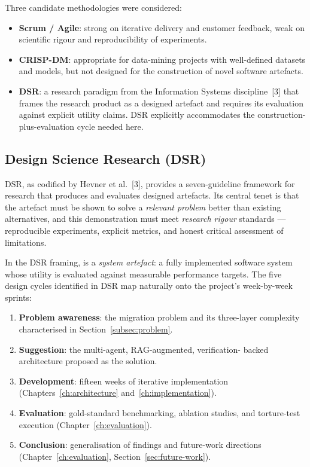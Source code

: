 Three candidate methodologies were considered:

\begin{itemize}
  \item \textbf{Scrum / Agile}: strong on iterative delivery and customer
    feedback, weak on scientific rigour and reproducibility of experiments.
  \item \textbf{\ac{CRISP-DM}}: appropriate for data-mining projects with
    well-defined datasets and models, but not designed for the construction
    of novel software artefacts.
  \item \textbf{\ac{DSR}}: a research paradigm from the Information Systems
    discipline~[3] that frames the research product as a designed artefact and
    requires its evaluation against explicit utility claims. \ac{DSR} explicitly
    accommodates the construction-plus-evaluation cycle needed here.
\end{itemize}

\subsection{Design Science Research (DSR)}
\label{subsec:dsr}

\ac{DSR}, as codified by Hevner et al.~[3], provides a seven-guideline
framework for research that produces and evaluates designed artefacts. Its
central tenet is that the artefact must be shown to solve a \emph{relevant
problem} better than existing alternatives, and this demonstration must meet
\emph{research rigour} standards --- reproducible experiments, explicit metrics,
and honest critical assessment of limitations.

In the \ac{DSR} framing, \codara{} is a \emph{system artefact}: a fully
implemented software system whose utility is evaluated against measurable
performance targets. The five design cycles identified in \ac{DSR} map
naturally onto the project's week-by-week sprints:

\begin{enumerate}
  \item \textbf{Problem awareness}: the migration problem and its three-layer
    complexity characterised in Section~\ref{subsec:problem}.
  \item \textbf{Suggestion}: the multi-agent, \ac{RAG}-augmented, verification-
    backed architecture proposed as the solution.
  \item \textbf{Development}: fifteen weeks of iterative implementation
    (Chapters~\ref{ch:architecture} and~\ref{ch:implementation}).
  \item \textbf{Evaluation}: gold-standard benchmarking, ablation studies, and
    torture-test execution (Chapter~\ref{ch:evaluation}).
  \item \textbf{Conclusion}: generalisation of findings and future-work
    directions (Chapter~\ref{ch:evaluation}, Section~\ref{sec:future-work}).
\end{enumerate}

